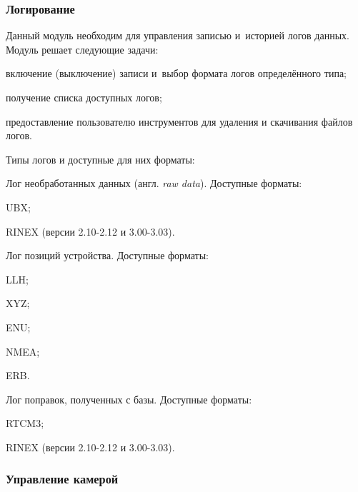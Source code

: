 \subsubsection{Логирование}

Данный модуль необходим для управления записью и~историей логов данных. Модуль решает следующие задачи:
\begin{dashitemize}
  \item включение (выключение) записи и~выбор формата логов определённого типа;
  \item получение списка доступных логов;
  \item предоставление пользователю инструментов для удаления и скачивания файлов логов.
\end{dashitemize}

Типы логов и доступные для них форматы:
\begin{dashitemize}
  \item Лог необработанных данных (англ. \emph{raw data}). Доступные форматы:
  \begin{dashitemize}
    \item UBX;
    \item RINEX (версии 2.10-2.12 и 3.00-3.03).
  \end{dashitemize}
  
  \item Лог позиций устройства. Доступные форматы:
  \begin{dashitemize}
    \item LLH;
    \item XYZ;
    \item ENU;
    \item NMEA;
    \item ERB.
  \end{dashitemize}
  
  \item Лог поправок, полученных с базы. Доступные форматы:
  \begin{dashitemize}
    \item RTCM3;
    \item RINEX (версии 2.10-2.12 и 3.00-3.03).
  \end{dashitemize}
\end{dashitemize}


\subsubsection{Управление камерой}

